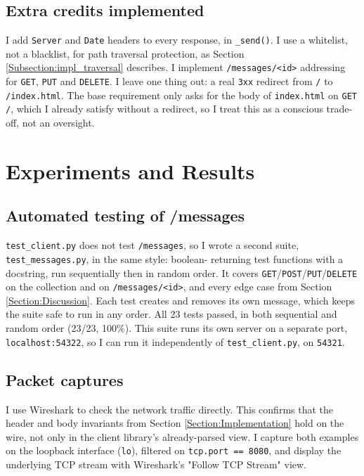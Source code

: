 \documentclass[conference]{IEEEtran}
\begin{document}
\subsection{Extra credits implemented}\label{Subsection:impl_extra}
I add \texttt{Server} and \texttt{Date} headers to every response, in
\texttt{\_send()}. I use a whitelist, not a blacklist, for path traversal
protection, as Section \ref{Subsection:impl_traversal} describes. I
implement \texttt{/messages/<id>} addressing for \texttt{GET},
\texttt{PUT} and \texttt{DELETE}. I leave one thing out: a real
\texttt{3xx} redirect from \texttt{/} to \texttt{/index.html}. The base
requirement only asks for the body of \texttt{index.html} on
\texttt{GET /}, which I already satisfy without a redirect, so I treat
this as a conscious trade-off, not an oversight.

\section{Experiments and Results}\label{Section:Experiments and Results}

\subsection{Automated testing of /messages}\label{Subsection:results_messages}
\texttt{test\_client.py} does not test \texttt{/messages}, so I wrote a
second suite, \texttt{test\_messages.py}, in the same style: boolean-
returning test functions with a docstring, run sequentially then in random
order. It covers \texttt{GET}/\texttt{POST}/\texttt{PUT}/\texttt{DELETE} on
the collection and on \texttt{/messages/<id>}, and every edge case from
Section \ref{Section:Discussion}.
Each test creates and removes its own message, which keeps the suite safe
to run in any order. All 23 tests passed, in both sequential and random
order (23/23, 100\%). This suite runs its own server on a separate port,
\texttt{localhost:54322}, so I can run it independently of
\texttt{test\_client.py}, on \texttt{54321}.

\subsection{Packet captures}\label{Subsection:results_wireshark}
I use Wireshark to check the network traffic directly. This confirms that
the header and body invariants from Section \ref{Section:Implementation}
hold on the wire, not only in the client library's already-parsed view. I
capture both examples on the loopback interface (\texttt{lo}), filtered on
\texttt{tcp.port == 8080}, and display the underlying TCP stream with
Wireshark's "Follow TCP Stream" view.
\end{document}
